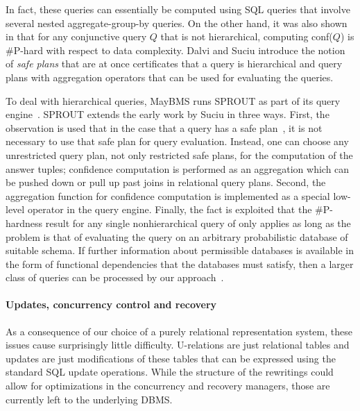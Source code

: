 In fact, these queries can essentially be computed using SQL queries
that involve several nested aggregate-group-by queries. On the other
hand, it was also shown in \cite{dalvi07efficient} that for any
conjunctive query $Q$ that is not hierarchical, computing conf($Q$) is
\#P-hard with respect to data complexity. Dalvi and Suciu introduce
the notion of {\em safe plans}\/ that are at once
certificates that a query is hierarchical and query plans with
aggregation operators that can be used for evaluating the queries.

To deal with hierarchical queries, MayBMS runs SPROUT as part of its
query engine~\cite{OHK2008}. SPROUT extends the early work by Suciu in
three ways. First, the observation is used that in the case that a
query has a safe plan~\cite{dalvi07efficient}, it is not necessary to
use that safe plan for query evaluation. Instead, one can choose any
unrestricted query plan, not only restricted safe plans, for the
computation of the answer tuples; confidence computation is performed
as an aggregation which can be pushed down or pull up past joins in
relational query plans. Second, the aggregation function for
confidence computation is implemented as a special low-level operator
in the query engine. Finally, the fact is exploited that the
\#P-hardness result for any single nonhierarchical query of \cite{dalvi07efficient} 
only applies as long as the problem is that of evaluating the query on
an arbitrary probabilistic database of suitable schema. If further
information about permissible databases is available in the form of
functional dependencies that the databases must satisfy, then a larger
class of queries can be processed by our approach~\cite{OHK2008}.


\paragraph{Updates, concurrency control and recovery}
%
As a consequence of our choice of a purely relational representation
system, these issues cause surprisingly little difficulty.
U-relations are just relational tables and updates are just
modifications of these tables that can be expressed using the standard
SQL update operations. While the structure of the rewritings could allow for optimizations in the concurrency and recovery managers, those are currently left to the underlying DBMS.




